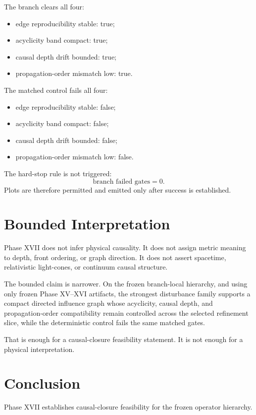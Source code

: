 \documentclass[11pt]{article}
\begin{document}
The branch clears all four:
\begin{itemize}
\item edge reproducibility stable: true;
\item acyclicity band compact: true;
\item causal depth drift bounded: true;
\item propagation-order mismatch low: true.
\end{itemize}

The matched control fails all four:
\begin{itemize}
\item edge reproducibility stable: false;
\item acyclicity band compact: false;
\item causal depth drift bounded: false;
\item propagation-order mismatch low: false.
\end{itemize}

The hard-stop rule is not triggered:
\[
\text{branch failed gates}=0.
\]
Plots are therefore permitted and emitted only after success is established.

\section{Bounded Interpretation}

Phase XVII does not infer physical causality. It does not assign metric meaning to depth, front ordering, or graph direction. It does not assert spacetime, relativistic light-cones, or continuum causal structure.

The bounded claim is narrower. On the frozen branch-local hierarchy, and using only frozen Phase XV--XVI artifacts, the strongest disturbance family supports a compact directed influence graph whose acyclicity, causal depth, and propagation-order compatibility remain controlled across the selected refinement slice, while the deterministic control fails the same matched gates.

That is enough for a causal-closure feasibility statement. It is not enough for a physical interpretation.

\section{Conclusion}

Phase XVII establishes causal-closure feasibility for the frozen operator hierarchy.
\end{document}
